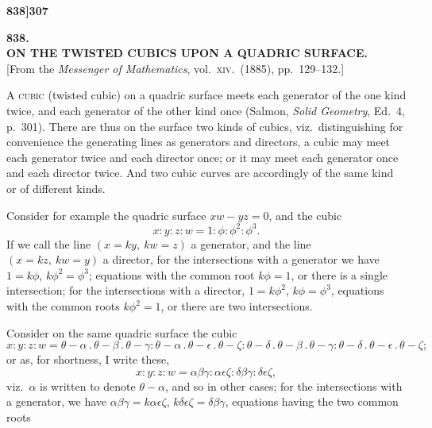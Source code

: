 \documentclass[11pt]{article}
\begin{document}
\bigskip
\bigskip


\newpage

\noindent\textbf{838]}\hfill\textbf{307}

\bigskip

\begin{center}
{\large\textbf{838.}}\\[0.7em]
{\large\textbf{ON THE TWISTED CUBICS UPON A QUADRIC SURFACE.}}\\[1em]
{\small [From the \textit{Messenger of Mathematics}, vol.\ \textsc{xiv}.\ (1885), pp.\ 129--132.]}
\end{center}

\bigskip

\noindent A \textsc{cubic} (twisted cubic) on a quadric surface meets each generator of the one kind twice, and each generator of the other kind once (Salmon, \textit{Solid Geometry}, Ed.\ 4, p.\ 301). There are thus on the surface two kinds of cubics, viz.\ distinguishing for convenience the generating lines as generators and directors, a cubic may meet each generator twice and each director once; or it may meet each generator once and each director twice. And two cubic curves are accordingly of the same kind or of different kinds.

\medskip

Consider for example the quadric surface $xw - yz = 0$, and the cubic
\[
x : y : z : w = 1 : \phi : \phi^{2} : \phi^{3}.
\]
If we call the line $(x = ky,\ kw = z)$ a generator, and the line $(x = kz,\ kw = y)$ a director, for the intersections with a generator we have $1 = k\phi$, $k\phi^{2} = \phi^{3}$; equations with the common root $k\phi = 1$, or there is a single intersection; for the intersections with a director, $1 = k\phi^{2}$, $k\phi = \phi^{3}$, equations with the common roots $k\phi^{2} = 1$, or there are two intersections.

\medskip

Consider on the same quadric surface the cubic
\[
x : y : z : w = \theta - \alpha\,.\,\theta - \beta\,.\,\theta - \gamma : \theta - \alpha\,.\,\theta - \epsilon\,.\,\theta - \zeta : \theta - \delta\,.\,\theta - \beta\,.\,\theta - \gamma : \theta - \delta\,.\,\theta - \epsilon\,.\,\theta - \zeta;
\]
or as, for shortness, I write these,
\[
x : y : z : w = \alpha\beta\gamma : \alpha\epsilon\zeta : \delta\beta\gamma : \delta\epsilon\zeta,
\]
viz.\ $\alpha$ is written to denote $\theta - \alpha$, and so in other cases; for the intersections with a generator, we have $\alpha\beta\gamma = k\alpha\epsilon\zeta$, $k\delta\epsilon\zeta = \delta\beta\gamma$, equations having the two common roots
\end{document}

